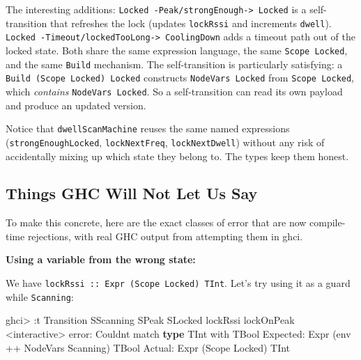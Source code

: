 \documentclass[]{article}
\newenvironment{Shaded}{}{}
\newcommand{\DataTypeTok}[1]{\textcolor[rgb]{0.56,0.13,0.00}{#1}}
\newcommand{\FunctionTok}[1]{\textcolor[rgb]{0.02,0.16,0.49}{#1}}
\newcommand{\KeywordTok}[1]{\textcolor[rgb]{0.00,0.44,0.13}{\textbf{#1}}}
\newcommand{\NormalTok}[1]{#1}
\newcommand{\OperatorTok}[1]{\textcolor[rgb]{0.40,0.40,0.40}{#1}}
\begin{document}
The interesting additions:
\texttt{Locked\ -Peak/strongEnough-\textgreater{}\ Locked} is a self-transition
that refreshes the lock (updates \texttt{lockRssi} and increments
\texttt{dwell}).
\texttt{Locked\ -Timeout/lockedTooLong-\textgreater{}\ CoolingDown} adds a
timeout path out of the locked state. Both share the same expression language,
the same \texttt{Scope\ Locked}, and the same \texttt{Build} mechanism. The
self-transition is particularly satisfying: a
\texttt{Build\ (Scope\ Locked)\ Locked} constructs \texttt{NodeVars\ Locked}
from \texttt{Scope\ Locked}, which \emph{contains} \texttt{NodeVars\ Locked}. So
a self-transition can read its own payload and produce an updated version.

Notice that \texttt{dwellScanMachine} reuses the same named expressions
(\texttt{strongEnoughLocked}, \texttt{lockNextFreq}, \texttt{lockNextDwell})
without any risk of accidentally mixing up which state they belong to. The types
keep them honest.

\subsection{Things GHC Will Not Let Us
Say}\label{things-ghc-will-not-let-us-say}

To make this concrete, here are the exact classes of error that are now
compile-time rejections, with real GHC output from attempting them in ghci.

\textbf{Using a variable from the wrong state:}

We have \texttt{lockRssi\ ::\ Expr\ (Scope\ Locked)\ TInt}. Let's try using it
as a guard while \texttt{Scanning}:

\begin{Shaded}
\begin{Highlighting}[]
\NormalTok{ghci}\OperatorTok{\textgreater{}} \OperatorTok{:}\NormalTok{t }\DataTypeTok{Transition} \DataTypeTok{SScanning} \DataTypeTok{SPeak} \DataTypeTok{SLocked}\NormalTok{ lockRssi lockOnPeak}
\OperatorTok{\textless{}}\NormalTok{interactive}\OperatorTok{\textgreater{}} \FunctionTok{error}\OperatorTok{:}
    \DataTypeTok{Couldn\textquotesingle{}t}\NormalTok{ match }\KeywordTok{type} \DataTypeTok{\textquotesingle{}TInt\textquotesingle{}}\NormalTok{ with }\DataTypeTok{\textquotesingle{}TBool\textquotesingle{}}
      \DataTypeTok{Expected}\OperatorTok{:} \DataTypeTok{Expr}\NormalTok{ (env }\OperatorTok{++} \DataTypeTok{NodeVars} \DataTypeTok{Scanning}\NormalTok{) }\DataTypeTok{TBool}
        \DataTypeTok{Actual}\OperatorTok{:} \DataTypeTok{Expr}\NormalTok{ (}\DataTypeTok{Scope} \DataTypeTok{Locked}\NormalTok{) }\DataTypeTok{TInt}
\end{Highlighting}
\end{Shaded}
\end{document}
